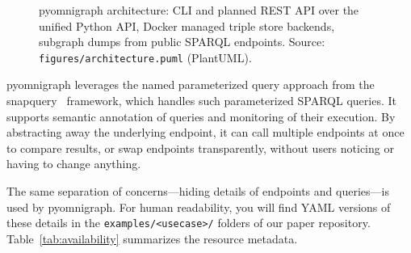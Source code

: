 \documentclass[
]{ceurart}
\begin{document}
\begin{figure}
\centering

\caption{pyomnigraph architecture: CLI and planned REST API over the unified
Python API, Docker managed triple store backends, subgraph dumps from public
SPARQL endpoints. Source: \texttt{figures/architecture.puml} (PlantUML).}
\label{fig:architecture}
\end{figure} 

pyomnigraph leverages the named parameterized query approach from the snapquery~\cite{snapquery} framework, which handles such parameterized SPARQL queries. It supports semantic annotation of queries and monitoring of their execution. By abstracting away the underlying endpoint, it can call multiple endpoints at once to compare results, or swap endpoints transparently, without users noticing or having to change anything.

The same separation of concerns---hiding details of endpoints and queries---is used by pyomnigraph. For human readability, you will find YAML versions of these details in the \texttt{examples/<usecase>/} folders of our paper repository.
Table~\ref{tab:availability} summarizes the resource metadata.
\end{document}
